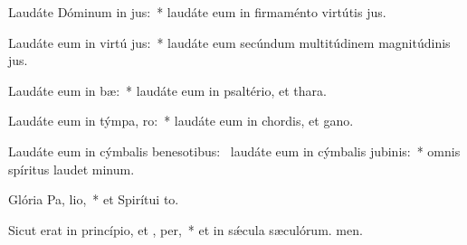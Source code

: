 \item Laudáte Dóminum in  jus:~* laudáte eum in firmaménto virtútis jus.
\item Laudáte eum in virtú jus:~* laudáte eum secúndum multitúdinem magnitúdinis jus.
\item Laudáte eum in  bæ:~* laudáte eum in psaltério, et thara.
\item Laudáte eum in týmpa,  ro:~* laudáte eum in chordis, et gano.
\item Laudáte eum in cýmbalis benesotibus:~\pscross{} laudáte eum in cýmbalis jubinis:~* omnis spíritus laudet minum.
\item Glória Pa,  lio,~* et Spirítui to.
\item Sicut erat in princípio, et ,  per,~* et in sǽcula sæculórum. men.
